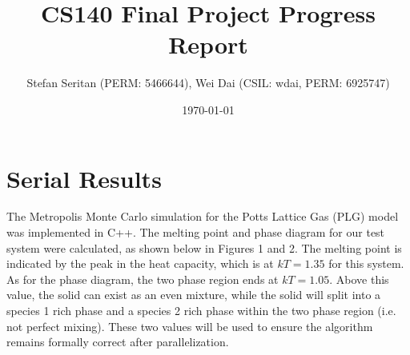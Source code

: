 \documentclass{article}
\author{Stefan Seritan (PERM: 5466644), Wei Dai (CSIL: wdai, PERM: 6925747)}
\date{\today}
\title{CS140 Final Project Progress Report}
\begin{document}
\maketitle

\section*{Serial Results}
\vspace{-7pt}
\indent\indent The Metropolis Monte Carlo simulation for the Potts Lattice Gas (PLG) model was implemented in C++. The melting point and phase diagram for our test system were calculated, as shown below in Figures 1 and 2. The melting point is indicated by the peak in the heat capacity, which is at $kT = 1.35$ for this system. As for the phase diagram, the two phase region ends at $kT = 1.05$. Above this value, the solid can exist as an even mixture, while the solid will split into a species 1 rich phase and a species 2 rich phase within the two phase region (i.e. not perfect mixing). These two values will be used to ensure the algorithm remains formally correct after parallelization.
\end{document}
